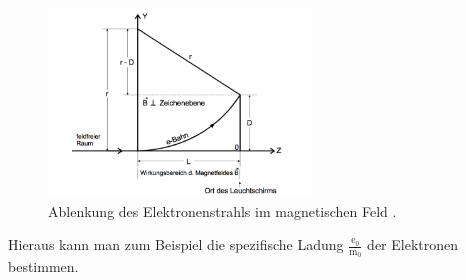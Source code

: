 \begin{figure}[H]
  \centering
  \includegraphics[height=5cm]{Magnet.png}
  \caption{Ablenkung des Elektronenstrahls im magnetischen Feld \cite{skript2}.}
  \label{fig:magnet}
\end{figure}
Hieraus kann man zum Beispiel die spezifische Ladung $ \frac{{\text{e}_0}}{{\text{m}_0}} $
der Elektronen bestimmen.
